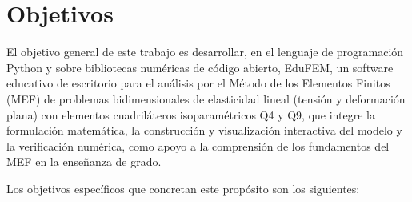 \section*{Objetivos}

El objetivo general de este trabajo es desarrollar, en el lenguaje de programación Python y sobre bibliotecas numéricas de código abierto, EduFEM, un software educativo de escritorio para el análisis por el Método de los Elementos Finitos (MEF) de problemas bidimensionales de elasticidad lineal (tensión y deformación plana) con elementos cuadriláteros isoparamétricos Q4 y Q9, que integre la formulación matemática, la construcción y visualización interactiva del modelo y la verificación numérica, como apoyo a la comprensión de los fundamentos del MEF en la enseñanza de grado.

Los objetivos específicos que concretan este propósito son los siguientes:

